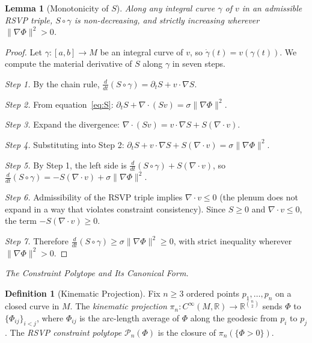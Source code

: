 \documentclass[11pt]{article}
\theoremstyle{plain}
\newtheorem{lemma}[theorem]{Lemma}
\theoremstyle{definition}
\newtheorem{definition}[theorem]{Definition}
\theoremstyle{remark}
\newcommand{\R}{\mathbb{R}}
\newcommand{\Phif}{\Phi}
\newcommand{\vf}{v}
\newcommand{\Sf}{S}
\begin{document}
\begin{lemma}[Monotonicity of $\Sf$]
\label{lem:S-monotone}
Along any integral curve $\gamma$ of $\vf$ in an admissible RSVP triple, $\Sf \circ \gamma$ is non-decreasing, and strictly increasing wherever $\|\nabla\Phif\|^2 > 0$.
\end{lemma}

\begin{proof}
Let $\gamma: [a,b] \to M$ be an integral curve of $\vf$, so $\dot\gamma(t) = \vf(\gamma(t))$. We compute the material derivative of $\Sf$ along $\gamma$ in seven steps.

\emph{Step 1.} By the chain rule, $\frac{d}{dt}(\Sf \circ \gamma) = \partial_t \Sf + \vf \cdot \nabla \Sf$.

\emph{Step 2.} From equation~\eqref{eq:S}: $\partial_t \Sf + \nabla \cdot (\Sf \vf) = \sigma\|\nabla\Phif\|^2$.

\emph{Step 3.} Expand the divergence: $\nabla \cdot (\Sf \vf) = \vf \cdot \nabla \Sf + \Sf (\nabla \cdot \vf)$.

\emph{Step 4.} Substituting into Step 2: $\partial_t \Sf + \vf \cdot \nabla \Sf + \Sf(\nabla \cdot \vf) = \sigma\|\nabla\Phif\|^2$.

\emph{Step 5.} By Step 1, the left side is $\frac{d}{dt}(\Sf \circ \gamma) + \Sf(\nabla \cdot \vf)$, so $\frac{d}{dt}(\Sf \circ \gamma) = -\Sf(\nabla \cdot \vf) + \sigma\|\nabla\Phif\|^2$.

\emph{Step 6.} Admissibility of the RSVP triple implies $\nabla \cdot \vf \leq 0$ (the plenum does not expand in a way that violates constraint consistency). Since $\Sf \geq 0$ and $\nabla \cdot \vf \leq 0$, the term $-\Sf(\nabla \cdot \vf) \geq 0$.

\emph{Step 7.} Therefore $\frac{d}{dt}(\Sf \circ \gamma) \geq \sigma\|\nabla\Phif\|^2 \geq 0$, with strict inequality wherever $\|\nabla\Phif\|^2 > 0$.
\end{proof}

\medskip\noindent\textit{The Constraint Polytope and Its Canonical Form.}

\begin{definition}[Kinematic Projection]
Fix $n \geq 3$ ordered points $p_1, \ldots, p_n$ on a closed curve in $M$. The \emph{kinematic projection} $\pi_n: C^\infty(M,\R) \to \R^{\binom{n}{2}}$ sends $\Phif$ to $\{\Phif_{ij}\}_{i < j}$, where $\Phif_{ij}$ is the arc-length average of $\Phif$ along the geodesic from $p_i$ to $p_j$. The \emph{RSVP constraint polytope} $\mathcal{P}_n(\Phif)$ is the closure of $\pi_n(\{\Phif > 0\})$.
\end{definition}
\end{document}
